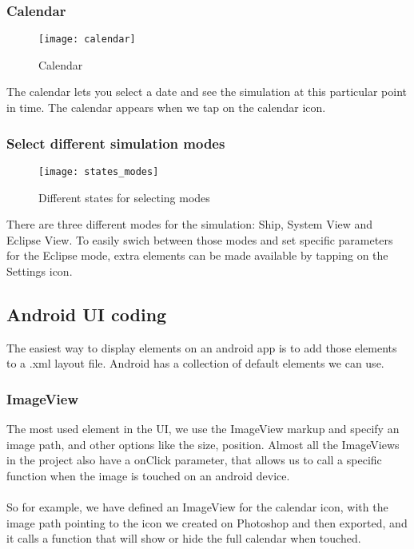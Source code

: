 \subsubsection{Calendar}

\begin{figure}[!htbp]
  \begin{center}
    \leavevmode
    \ifpdf
      \texttt{[image: calendar]}
    \fi
    \caption{Calendar}
    \label{Calendar}
  \end{center}
\end{figure}

The calendar lets you select a date and see the simulation at this particular point in time. The calendar appears when we tap on the calendar icon.

\subsubsection{Select different simulation modes}

\begin{figure}[!htbp]
  \begin{center}
    \leavevmode
    \ifpdf
      \texttt{[image: states\_modes]}
    \fi
    \caption{Different states for selecting modes}
    \label{Different states for selecting modes}
  \end{center}
\end{figure}

There are three different modes for the simulation: Ship, System View and Eclipse View. To easily swich between those modes and set specific parameters for the Eclipse mode, extra elements can be made available by tapping on the Settings icon. 

\subsection{Android UI coding}

The easiest way to display elements on an android app is to add those elements to a .xml layout file. Android has a collection of default elements we can use.

\subsubsection{ImageView}

The most used element in the UI, we use the ImageView markup and specify an image path, and other options like the size, position. Almost all the ImageViews in the project also have a onClick parameter, that allows us to call a specific function when the image is touched on an android device.
\\\\
So for example, we have defined an ImageView for the calendar icon, with the image path pointing to the icon we created on Photoshop and then exported, and it calls a function that will show or hide the full calendar when touched.

